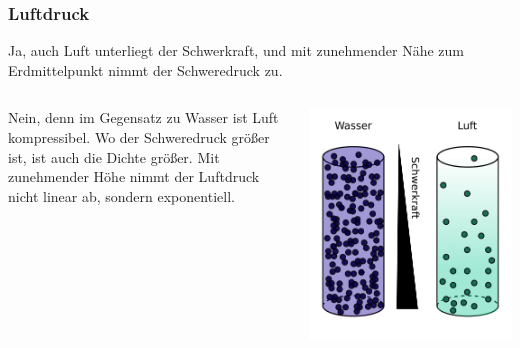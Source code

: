 \documentclass{beamer}
\begin{document}
\begin{frame}
\frametitle{Luftdruck}

\textcolor{theme}{Ja,} auch Luft unterliegt der Schwerkraft, und mit zunehmender Nähe zum Erdmittelpunkt nimmt der Schweredruck zu. 



\pause


\begin{columns}[c]

\begin{column}{5cm}
\textcolor{theme}{Nein,} denn im Gegensatz zu Wasser ist Luft kompressibel. Wo der Schweredruck größer ist, ist auch die Dichte größer. Mit zunehmender Höhe nimmt der Luftdruck nicht linear ab, sondern exponentiell. \\ 

\end{column}

\pause
\begin{column}{5cm}
\begin{center}
\includegraphics[width=\textwidth]{Wasserdruck_Luftdruck.png}
\end{center}
\end{column}
\end{columns}

\end{frame}
\end{document}
